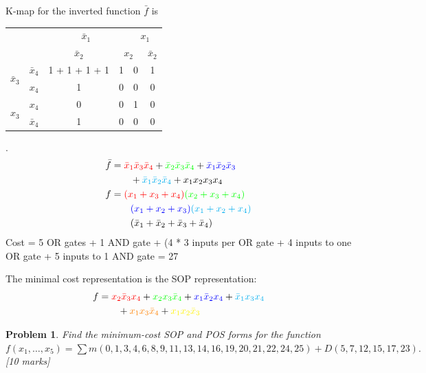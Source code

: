 \documentclass[twocolumn]{article}
\newtheorem{prob}{Problem}
\newcommand{\bx}{\bar{x}}
\newcommand{\cred}{\color{red}}
\newcommand{\cg}{\color{green}}
\newcommand{\cb}{\color{blue}}
\begin{document}
 K-map for the inverted function $\bar{f}$ is
 \\
 \begin{tabular}{c|c|c|c|c|c}
   \toprule
   && \multicolumn{2}{c|}{$\bx_1$} & \multicolumn{2}{c}{$x_1$}
   \\
   && $\bx_2$ & \multicolumn{2}{c|}{$x_2$} & $\bx_2$
   \\ \midrule
   \multirow{2}{*}{$\bx_3$} & $\bx_4$
                                   & \cred 1 + \cg 1 + \cb 1 + \color{cyan} 1 & \cred 1 &  0 &  \cg 1
   \\
   & $x_4$
                                   & \cb 1 & 0 & 0 & 0
   \\
   \multirow{2}{*}{$x_3$}   &  $x_4$
                                   & 0 & 0 & 1 & 0
   \\
   & $\bx_4$
                                   & \color{cyan} 1 & 0 & 0 & 0
   \\\bottomrule
 \end{tabular}.
 \\
 \begin{align*}
   \bar{f} &= {\cred \bx_1 \bx_3 \bx_4 } + {\cg \bx_2 \bx_3 \bx_4} + {\cb \bx_1 \bx_2 \bx_3 }
   \\
   &\qquad + {\color{cyan} \bx_1 \bx_2 \bx_4 } + x_1 x_2 x_3 x_4
   \\
   f &= {\cred (x_1 + x_3 + x_4) } {\cg (x_2 + x_3 + x_4)} 
   \\
           &\qquad {\cb (x_1 + x_2 + x_3)}{\color{cyan} (x_1 + x_2 + x_4)}
   \\
   &\qquad (\bx_1 + \bx_2+ \bx_3 + \bx_4)
 \end{align*}
 Cost = 5 OR gates + 1 AND gate + (4 * 3 inputs per OR gate + 4 inputs to one OR
 gate + 5 inputs to 1 AND gate = 27

 The minimal cost representation is the SOP representation:
 \begin{align*}
   f &= { \cred x_2 \bx_3 x_4 } +  { \cg x_2 x_3 \bx_4} + {\cb x_1 \bx_2 x_4} +
       {\color{cyan} \bx_1 x_3 x_4 }
   \\
     &\qquad + {\color{orange} x_1 x_3 \bx_4} +
       {\color{yellow} x_1 x_2 \bx_3 }
 \end{align*}


\begin{prob}
  Find the minimum-cost SOP and POS forms for the function $f(x_1 , \dots, x_5) =
  \sum m(0, 1, 3, 4, 6, 8, 9, 11, 13, 14, 16, 19, 20, 21, 22, 24, 25) + D(5, 7,
  12, 15, 17, 23).$  \cite[Prob 2.42]{brown2013fundamentals} [10 marks]
\end{prob}
\end{document}
